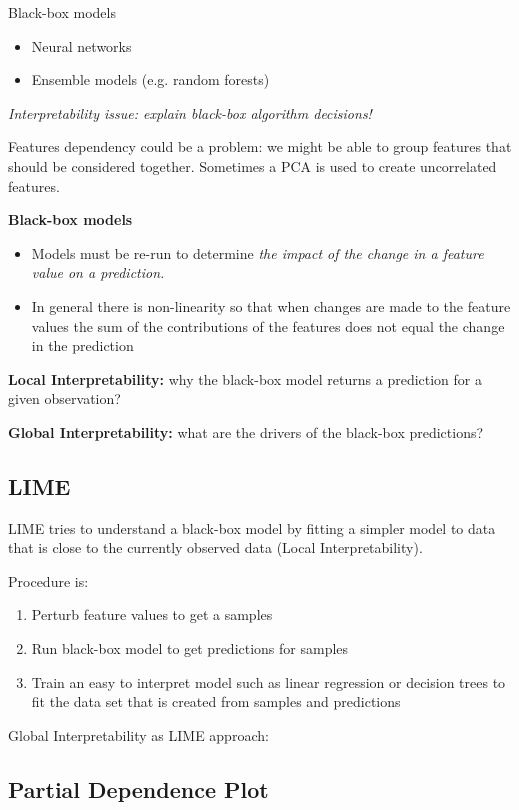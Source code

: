 Black-box models
\begin{itemize}
    \item Neural networks
    \item Ensemble models (e.g. random forests)
\end{itemize}

\textit{Interpretability issue: explain black-box algorithm decisions!}

Features dependency could be a problem: we might be able to group features that should be considered together. Sometimes a PCA is used to create uncorrelated features. 

\textbf{Black-box models}
\begin{itemize}
    \item Models must be re-run to determine \textit{the impact of the change in a feature value on a prediction.}
    \item In general there is non-linearity so that when changes are made to the feature values the sum of the contributions of the features does not equal the change in the prediction
\end{itemize}

\textbf{Local Interpretability:} why the black-box model returns a prediction for a given observation?

\textbf{Global Interpretability:} what are the drivers of the black-box predictions?

\subsection{LIME}

LIME tries to understand a black-box model by fitting a simpler model to data that is close to the currently observed data (Local Interpretability).

Procedure is:
\begin{enumerate}
    \item Perturb feature values to get a samples
    \item Run black-box model to get predictions for samples
    \item Train an easy to interpret model such as linear regression or decision trees to fit the data set that is created from samples and predictions
\end{enumerate}

Global Interpretability as LIME approach:

\subsection{Partial Dependence Plot}

